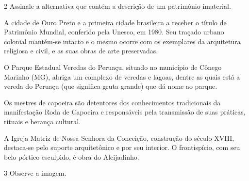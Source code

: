 
\num{2}  Assinale a alternativa que contém a descrição de um patrimônio imaterial.

\begin{escolha}
\item
  A cidade de Ouro Preto e a primeira cidade brasileira a receber o
  título de Patrimônio Mundial, conferido pela Unesco, em 1980. Seu
  traçado urbano colonial mantém-se intacto e o mesmo ocorre com os
  exemplares da arquitetura religiosa e civil, e as suas obras de arte
  preservadas.
\item
  O Parque Estadual Veredas do Peruaçu, situado no município de Cônego
  Marinho (MG), abriga um complexo de veredas e lagoas, dentre as quais
  está a vereda do Peruaçu (que significa gruta grande) que dá nome ao
  parque.
\item
  Os mestres de capoeira são detentores dos conhecimentos tradicionais
  da manifestação Roda de Capoeira e responsáveis pela transmissão de
  suas práticas, rituais e herança cultural.
\item
  A Igreja Matriz de Nossa Senhora da Conceição, construção do século
  XVIII, destaca-se pelo suporte arquitetônico e por seu interior. O
  frontispício, com seu belo pórtico esculpido, é obra do Aleijadinho.
\end{escolha}



\num{3}  Observe a imagem.


